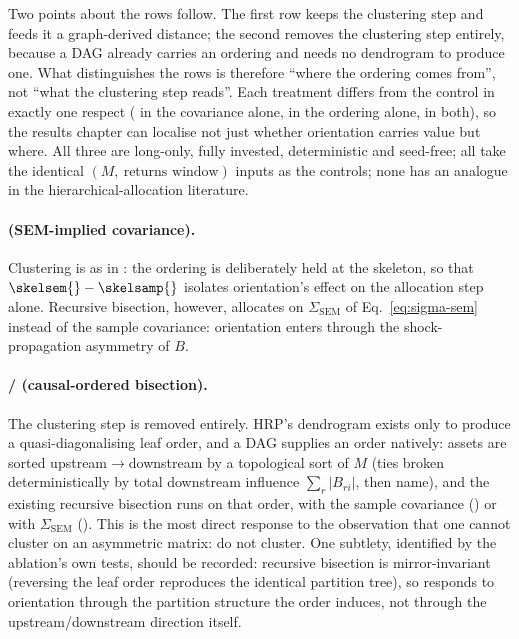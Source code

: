 Two points about the rows follow. The first row keeps the clustering step
and feeds
it a graph-derived distance; the second removes the clustering step
entirely, because a DAG already carries an ordering and needs no dendrogram
to produce one. What distinguishes the rows is therefore ``where the
ordering comes from'', not
``what the clustering step reads''. Each treatment differs from the
control in exactly one respect (\skelsem{} in the covariance alone,
\orientsamp{} in the
ordering alone, \orientsem{} in both), so the results chapter can localise
not just
whether orientation carries value but where. All three are long-only,
fully invested, deterministic and seed-free; all take the identical
$(M,\ \text{returns window})$ inputs as the controls; none has an analogue in
the hierarchical-allocation literature.

\paragraph{\skelsem{} (SEM-implied covariance).} Clustering is as in
\skelsamp{}: the
ordering is deliberately held at the skeleton, so that
$\skelsem{}-\skelsamp{}$ isolates orientation's effect on the allocation
step
alone. Recursive bisection, however, allocates on $\Sigma_{\mathrm{SEM}}$
of
Eq.~\eqref{eq:sigma-sem} instead of the sample covariance: orientation
enters through the shock-propagation asymmetry of $B$.

\paragraph{\orientsamp{} / \orientsem{} (causal-ordered bisection).}
\label{sec:d2}
The clustering step is removed entirely. HRP's dendrogram exists only to
produce a quasi-diagonalising leaf order, and a DAG supplies an order
natively: assets are sorted upstream$\to$downstream by a topological sort
of
$M$ (ties broken deterministically by total downstream influence
$\sum_r |B_{ri}|$, then name), and the existing recursive bisection
runs on that order, with the sample covariance (\orientsamp{}) or with
$\Sigma_{\mathrm{SEM}}$ (\orientsem{}). This is the most direct response
to the
observation that one cannot cluster on an asymmetric matrix: do not
cluster.
One subtlety, identified by the ablation's own tests, should be recorded:
recursive bisection is mirror-invariant (reversing the leaf order
reproduces the identical partition tree), so \orientsamp{} responds to
orientation
through the partition structure the order induces, not through the
upstream/downstream direction itself.

